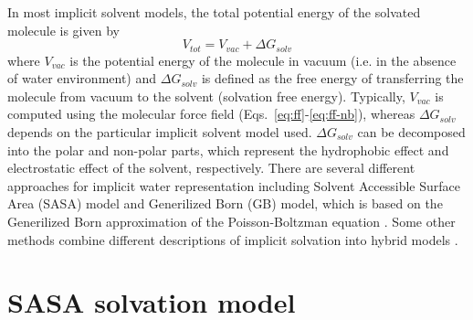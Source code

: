 \documentclass[11pt]{book}
\begin{document}
In most implicit solvent models, the total potential energy of the solvated molecule is given by
\begin{equation}\label{eq:implicit}
V_{tot} = V_{vac} + \Delta G_{solv}
\end{equation}
where $V_{vac}$ is the potential energy of the molecule in vacuum (i.e. in the absence of water environment) and $\Delta G_{solv}$ is defined as the free energy of transferring the molecule from vacuum to the solvent (solvation free energy). Typically, $V_{vac}$ is computed using the molecular force field (Eqs.~\ref{eq:ff}-\ref{eq:ff-nb}), whereas $\Delta G_{solv}$ depends on the particular implicit solvent model used. $\Delta G_{solv}$ can be decomposed into the polar and non-polar parts, which represent the hydrophobic effect and electrostatic effect of the solvent, respectively. There are several different approaches for implicit water representation \cite{ChenCOSB08,Charmm09} including Solvent Accessible Surface Area (SASA) model \cite{FerraraProteins02,FraternaliJMB96} and Generilized Born (GB) model, which is based on the Generilized Born approximation of the Poisson-Boltzman equation \cite{StillJACS90,DominyJPC99,LeeJCP02,LeeJCC03,HawkinsJPC96,OnufrievJPC00}. Some other methods \cite{LazaridisProteins99} combine different descriptions of implicit solvation into hybrid models \cite{QiuJPC97}. 


\section{SASA solvation model}
\end{document}
